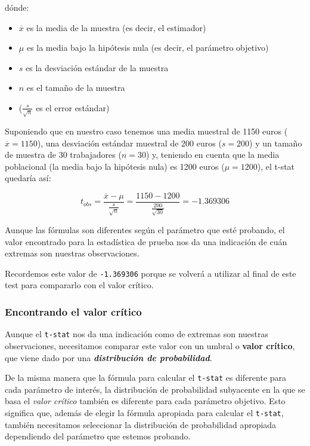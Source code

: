 \documentclass[
]{book}
\providecommand{\tightlist}{%
  \setlength{\itemsep}{0pt}\setlength{\parskip}{0pt}}
\begin{document}
dónde:

\begin{itemize}
\tightlist
\item
  \(\overline{x}\) es la media de la muestra (es decir, el estimador)
\item
  \(\mu\) es la media bajo la hipótesis nula (es decir, el parámetro objetivo)
\item
  \(s\) es la desviación estándar de la muestra
\item
  \(n\) es el tamaño de la muestra
\item
  (\(\frac{s}{\sqrt{n}}\) es el error estándar)
\end{itemize}

Suponiendo que en nuestro caso tenemos una media muestral de 1150 euros (\(\overline{x} = 1150\)), una desviación estándar muestral de 200 euros (\(s=200\)) y un tamaño de muestra de 30 trabajadores (\(n=30\)) y, teniendo en cuenta que la media poblacional (la media bajo la hipótesis nula) es 1200 euros (\(\mu=1200\)), el t-stat quedaría así:

\[t_{obs} = \frac{\overline{x} - \mu}{\frac{s}{\sqrt{n}}} = \frac{1150 - 1200}{\frac{200}{\sqrt{30}}} = -1.369306\]

Aunque las fórmulas son diferentes según el parámetro que esté probando, el valor encontrado para la estadística de prueba nos da una indicación de cuán extremas son nuestras observaciones.

Recordemos este valor de \texttt{-1.369306} porque se volverá a utilizar al final de este test para compararlo con el valor crítico.

\hypertarget{encontrando-el-valor-cruxedtico}{%
\subsubsection{Encontrando el valor crítico}\label{encontrando-el-valor-cruxedtico}}

Aunque el \texttt{t-stat} nos da una indicación como de extremas son nuestras observaciones, necesitamos comparar este valor con un umbral o \textbf{valor crítico}, que viene dado por una \textbf{\emph{distribución de probabilidad}}.

De la misma manera que la fórmula para calcular el \texttt{t-stat} es diferente para cada parámetro de interés, la distribución de probabilidad subyacente en la que se basa el \emph{valor crítico} también es diferente para cada parámetro objetivo. Esto significa que, además de elegir la fórmula apropiada para calcular el \texttt{t-stat}, también necesitamos seleccionar la distribución de probabilidad apropiada dependiendo del parámetro que estemos probando.
\end{document}
